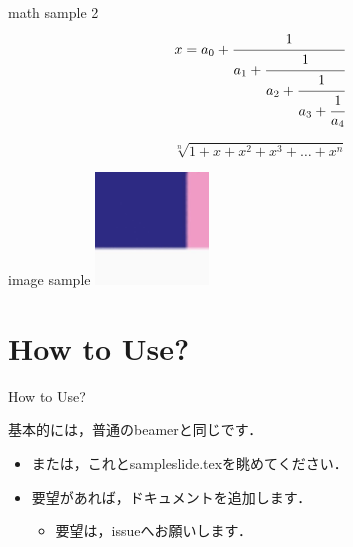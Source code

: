 \documentclass[aspectratio=1610,14pt]{beamer}
\begin{document}
\begin{frame}{math sample 2}
  \begin{equation}
    x = a_0 + \cfrac{1}{a_1 
      + \cfrac{1}{a_2 
        + \cfrac{1}{a_3 + \cfrac{1}{a_4} } } }
  \end{equation}

  \[
  \sqrt[n]{1+x+x^2+x^3+\dots+x^n}
  \]
\end{frame}
%
\begin{frame}{image sample}
    \includegraphics[width = 3cm]{./fig/kya}
\end{frame}

\section{How to Use?}

\begin{frame}
    \tableofcontents[currentsection]
\end{frame}

\begin{frame}{How to Use?}
    \begin{textblock}{基本的には，普通のbeamerと同じです．}
        \begin{itemize}
            \item{または，これとsampleslide.texを眺めてください．}
            \item{要望があれば，ドキュメントを追加します．}
                \begin{itemize}
                    \item{要望は，issueへお願いします．}
                \end{itemize}
        \end{itemize}
    \end{textblock}
\end{frame}
\end{document}
